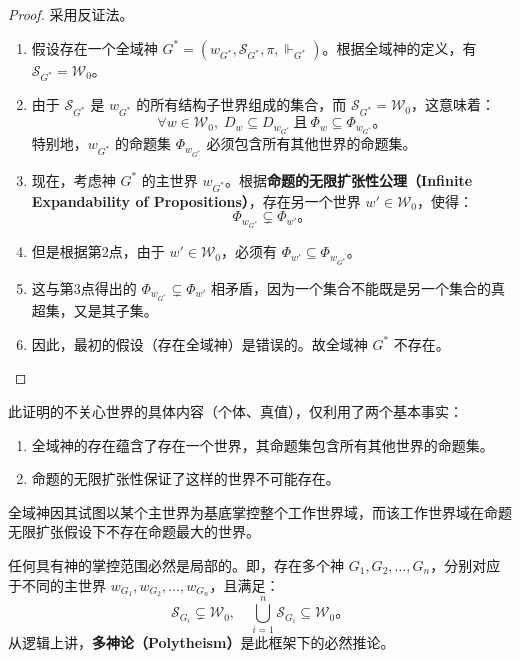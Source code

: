 \begin{proof}
    采用反证法。
    \begin{enumerate}
        \item 假设存在一个全域神 \( G^* = (w_{G^*}, \mathcal{S}_{G^*}, \pi, \Vdash_{G^*}) \)。根据全域神的定义，有 \( \mathcal{S}_{G^*} = \mathcal{W}_0 \)。
        \item 由于 \( \mathcal{S}_{G^*} \) 是 \( w_{G^*} \) 的所有结构子世界组成的集合，而 \( \mathcal{S}_{G^*}=\mathcal{W}_0 \)，这意味着：
              \begin{equation}
                  \forall w \in \mathcal{W}_0,\; D_w \subseteq D_{w_{G^*}} \ \text{且} \ \Phi_w \subseteq \Phi_{w_{G^*}}。
              \end{equation}
              特别地，\( w_{G^*} \) 的命题集 \( \Phi_{w_{G^*}} \) 必须包含所有其他世界的命题集。
        \item 现在，考虑神 \( G^* \) 的主世界 \( w_{G^*} \)。根据\textbf{命题的无限扩张性公理（Infinite Expandability of Propositions）}，存在另一个世界 \( w' \in \mathcal{W}_0 \)，使得：
              \begin{equation}
                  \Phi_{w_{G^*}} \subsetneq \Phi_{w'}。
              \end{equation}
        \item 但是根据第2点，由于 \( w' \in \mathcal{W}_0 \)，必须有 \( \Phi_{w'} \subseteq \Phi_{w_{G^*}} \)。
        \item 这与第3点得出的 \( \Phi_{w_{G^*}} \subsetneq \Phi_{w'} \) 相矛盾，因为一个集合不能既是另一个集合的真超集，又是其子集。
        \item 因此，最初的假设（存在全域神）是错误的。故全域神 \( G^* \) 不存在。
    \end{enumerate}
\end{proof}

\begin{remark}
    此证明的不关心世界的具体内容（个体、真值），仅利用了两个基本事实：
    \begin{enumerate}
        \item 全域神的存在蕴含了存在一个世界，其命题集包含所有其他世界的命题集。
        \item 命题的无限扩张性保证了这样的世界不可能存在。
    \end{enumerate}
    全域神因其试图以某个主世界为基底掌控整个工作世界域，而该工作世界域在命题无限扩张假设下不存在命题最大的世界。
\end{remark}

\begin{corollary}[多神论的逻辑必然性]
    任何具有神的掌控范围必然是局部的。即，存在多个神 \( G_1, G_2, \dots, G_n \)，分别对应于不同的主世界 \( w_{G_1}, w_{G_2}, \dots, w_{G_n} \)，且满足：
    \begin{equation}
        \mathcal{S}_{G_i} \subsetneq \mathcal{W}_0, \quad \bigcup_{i=1}^n \mathcal{S}_{G_i} \subseteq \mathcal{W}_0。
    \end{equation}
    从逻辑上讲，\textbf{多神论（Polytheism）}是此框架下的必然推论。
\end{corollary}


